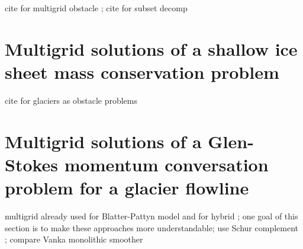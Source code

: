 \documentclass[letterpaper,final,12pt,reqno]{amsart}
\begin{document}
cite for multigrid obstacle \cite{BrandtCryer1983,Bueler2021,GraeserKornhuber2009,Jouvetetal2013}; cite for subset decomp \cite{Tai2003}

\section{Multigrid solutions of a shallow ice sheet mass conservation problem} \label{sec:sia}

cite for glaciers as obstacle problems \cite{Bueler2016,Bueler2020,Calvoetal2002,JouvetBueler2012}

\section{Multigrid solutions of a Glen-Stokes momentum conversation problem for a glacier flowline} \label{sec:stokes}

multigrid already used for Blatter-Pattyn model \cite{BrownSmithAhmadia2013} and for hybrid \cite{Jouvetetal2013}; one goal of this section is to make these approaches more understandable; use Schur complement \cite{Bueler2021,Elmanetal2014}; compare Vanka monolithic smoother \cite{Farrelletal2019}

\small

\bigskip


\end{document}
